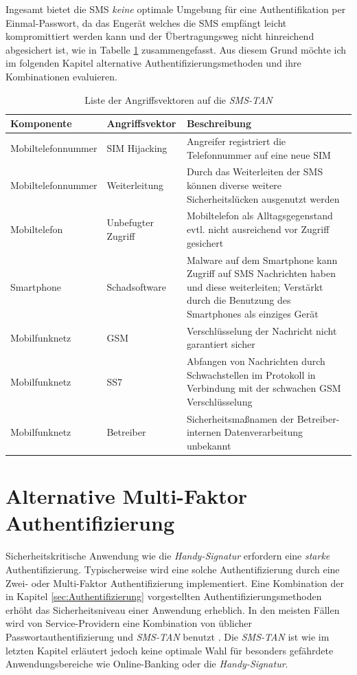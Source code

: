 \documentclass[11pt,a4paper,ngerman]{scrreprt}
\begin{document}
Ingesamt bietet die SMS \emph{keine} optimale Umgebung für eine Authentifikation per Einmal-Passwort, da das Engerät welches die SMS empfängt leicht kompromittiert werden kann und der Übertragungsweg nicht hinreichend abgesichert ist, wie in Tabelle \ref{table:AngriffsvektorenSMSTAN} zusammengefasst. Aus diesem Grund möchte ich im folgenden Kapitel alternative Authentifizierungsmethoden und ihre Kombinationen evaluieren.
\begin{table}[htbp]
    \begin{tabularx}{\textwidth}{ llX }
        \toprule
        Komponente & Angriffsvektor & Beschreibung  \\
        \midrule
        Mobiltelefonnummer & SIM Hijacking & Angreifer registriert die Telefonnummer auf eine neue SIM \\
        Mobiltelefonnummer & Weiterleitung & Durch das Weiterleiten der SMS können diverse weitere Sicherheitslücken ausgenutzt werden \\
        Mobiltelefon & Unbefugter Zugriff & Mobiltelefon als Alltagsgegenstand evtl. nicht ausreichend vor Zugriff gesichert \\
        Smartphone & Schadsoftware & Malware auf dem Smartphone kann Zugriff auf SMS Nachrichten haben und diese weiterleiten; Verstärkt durch die Benutzung des Smartphones als einziges Gerät \\
        Mobilfunknetz & GSM & Verschlüsselung der Nachricht nicht garantiert sicher \\
        Mobilfunknetz & SS7 & Abfangen von Nachrichten durch Schwachstellen im Protokoll in Verbindung mit der schwachen GSM Verschlüsselung \\
        Mobilfunknetz & Betreiber & Sicherheitsmaßnamen der Betreiber-internen Datenverarbeitung unbekannt \\
    \end{tabularx}
    \caption{Liste der Angriffsvektoren auf die \textit{SMS-TAN}}
    \label{table:AngriffsvektorenSMSTAN}
\end{table}

\chapter{Alternative Multi-Faktor Authentifizierung}
Sicherheitskritische Anwendung wie die \textit{Handy-Signatur} erfordern eine \emph{starke} Authentifizierung. Typischerweise wird eine solche Authentifizierung durch eine Zwei- oder Multi-Faktor Authentifizierung implementiert. Eine Kombination der in Kapitel \ref{sec:Authentifizierung} vorgestellten Authentifizierungsmethoden erhöht das Sicherheitsniveau einer Anwendung erheblich. In den meisten Fällen wird von Service-Providern eine Kombination von üblicher Passwortauthentifizierung und \textit{SMS-TAN} benutzt \cite{fido17}. Die \textit{SMS-TAN} ist wie im letzten Kapitel erläutert jedoch keine optimale Wahl für besonders gefährdete Anwendungsbereiche wie Online-Banking oder die \textit{Handy-Signatur}.
\end{document}
